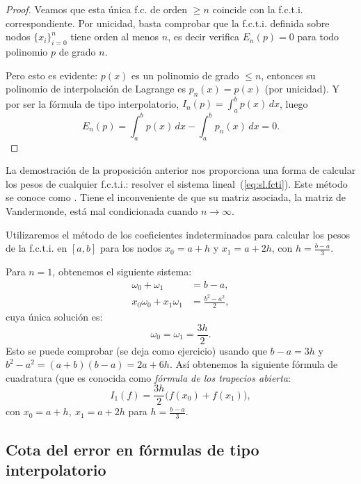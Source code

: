 \begin{proof}
   Veamos que esta única f.c. de orden $\ge n$ coincide con
  la f.c.t.i. correspondiente. Por unicidad, basta
  comprobar que la f.c.t.i. definida sobre nodos $\{x_i\}_{i=0}^n$
  tiene orden al menos $n$, es decir verifica $E_n(p)=0$ para todo
  polinomio $p$ de grado $n$.

  Pero esto es evidente: $p(x)$ es un polinomio de grado $\le n$,
  entonces su polinomio de interpolación de Lagrange es $p_n(x)=p(x)$
  (por unicidad).  Y por ser la fórmula de tipo interpolatorio,
  $I_n(p)=\int_a^b p(x)\,dx$, luego
  $$E_n(p)=\int_a^b p(x)\,dx - \int_a^b p_n(x)\,dx =0.$$
\end{proof}

\begin{remark}
  \label{rk:6}
  La demostración de la proposición anterior nos proporciona una forma
  de calcular los pesos de cualquier f.c.t.i.: resolver el sistema
lineal~(\ref{eq:sl.fcti}). Este método se conoce como . Tiene el inconveniente de que su
matriz asociada, la matriz de Vandermonde, está mal condicionada
  cuando $n\to\infty$.
\end{remark}

\begin{example}
  \label{ex:coef-indetermin:formula-trapecios-abierta}
  Utilizaremos el método de los coeficientes indeterminados para
  calcular los pesos de la f.c.t.i. en $[a,b]$ para los nodos
  $x_0=a+h$ y $x_1=a+2h$, con $h=\frac{b-a}{3}$.

  Para $n=1$, obtenemos el siguiente sistema:
  \begin{align*}
    \omega_0 + \omega_1 &= b-a,
    \\
    x_0\omega_0 + x_1\omega_1 &= \frac{b^2-a^2}{2},
  \end{align*}
  cuya única solución es:
  \begin{equation*}
    \omega_0=\omega_1=\frac{3h}{2}.
  \end{equation*}
  Esto se puede comprobar (se deja como ejercicio) usando
  que $b-a=3h$ y $b^2-a^2 = (a+b)(b-a)=2a + 6h$.
  Así obtenemos la siguiente fórmula de cuadratura (que es conocida
  como \textit{fórmula de los trapecios abierta}:
  \begin{equation*}
    I_1(f)=\frac{3h}{2}
    \big(
      f(x_0)+f(x_1)
    \big),
  \end{equation*}
  con $x_0=a+h, \ x_1=a+2h$ para $h=\frac{b-a}{3}$.
\end{example}

\subsection*{Cota del error en fórmulas de tipo interpolatorio}

